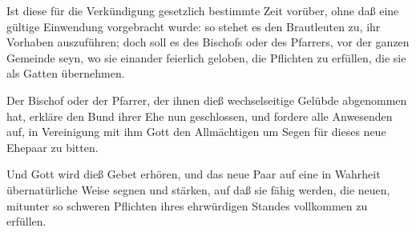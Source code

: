 \begin{aufza}
\item Ist diese für die Verkündigung gesetzlich bestimmte Zeit vorüber, ohne daß eine gültige Einwendung vorgebracht wurde: so stehet es den Brautleuten zu, ihr Vorhaben auszuführen; doch soll es  des Bischofs oder des Pfarrers, vor der ganzen Gemeinde seyn, wo sie einander feierlich geloben, die Pflichten zu erfüllen, die sie als Gatten übernehmen.
\item Der Bischof oder der Pfarrer, der ihnen dieß wechselseitige Gelübde abgenommen hat, erkläre den Bund ihrer Ehe nun geschlossen, und fordere alle Anwesenden auf, in Vereinigung mit ihm Gott den Allmächtigen um Segen für dieses neue Ehepaar zu bitten.
\item Und Gott wird dieß Gebet erhören, und das neue Paar auf eine in Wahrheit übernatürliche Weise segnen und stärken, auf daß sie fähig werden, die neuen, mitunter so schweren Pflichten ihres ehrwürdigen Standes vollkommen zu erfüllen.
\end{aufza}

